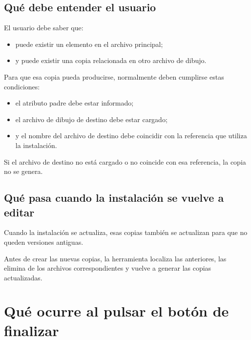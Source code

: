\subsection{Qué debe entender el usuario}

El usuario debe saber que:

\begin{itemize}
\item puede existir un elemento en el archivo principal;
\item y puede existir una copia relacionada en otro archivo de dibujo.
\end{itemize}

Para que esa copia pueda producirse, normalmente deben cumplirse estas condiciones:

\begin{itemize}
\item el atributo padre debe estar informado;
\item el archivo de dibujo de destino debe estar cargado;
\item y el nombre del archivo de destino debe coincidir con la referencia que utiliza la instalación.
\end{itemize}

Si el archivo de destino no está cargado o no coincide con esa referencia, la copia no se genera.

\subsection{Qué pasa cuando la instalación se vuelve a editar}

Cuando la instalación se actualiza, esas copias también se actualizan para que no queden versiones antiguas.

Antes de crear las nuevas copias, la herramienta localiza las anteriores, las elimina de los archivos correspondientes y vuelve a generar las copias actualizadas.


\section{Qué ocurre al pulsar el botón de finalizar}

